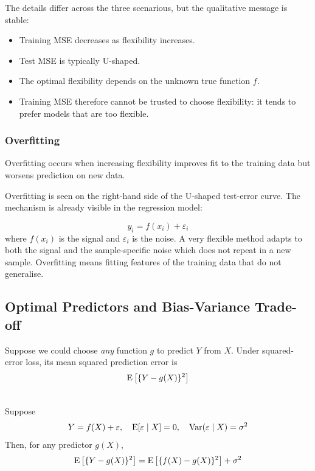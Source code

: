The details differ across the three scenarious, but the qualitative message is stable:
\begin{itemize}
    \item Training MSE decreases as flexibility increases.
    \item Test MSE is typically U-shaped.
    \item The optimal flexibility depends on the unknown true function $f$.
    \item Training MSE therefore cannot be trusted to choose flexibility: it tends to prefer models that are too flexible.
\end{itemize}

\subsubsection{Overfitting}

\begin{definition}[Overfitting]
    Overfitting occurs when increasing flexibility improves fit to the training data but worsens prediction on new data.
\end{definition}
Overfitting is seen on the right-hand side of the U-shaped test-error curve. The mechanism is already visible in the regression model:

\begin{equation*}
    y_i=f(x_i)+\varepsilon_i
\end{equation*}
where $f(x_i)$ is the signal and $\varepsilon_i$ is the noise. A very flexible method adapts to both the signal and the sample-specific noise which does not repeat in a new sample. Overfitting means fitting features of the training data that do not generalise.

\subsection{Optimal Predictors and Bias-Variance Trade-off}
Suppose we could choose \textit{any} function $g$ to predict $Y$ from $X$. Under squared-error loss, its mean squared prediction error is
\begin{equation*}
    \operatorname{E} \big[\{Y-g(X)\}^2\big]
\end{equation*}

\begin{theorem}\label{thm:errordecomp} \leavevmode \\
    Suppose
    \begin{equation*}
        Y=f(X)+\varepsilon, \quad \operatorname{E}[\varepsilon \mid X]=0, \quad \operatorname{Var}(\varepsilon \mid X)=\sigma^2
    \end{equation*}
    Then, for any predictor $g(X)$,
    \begin{equation*}
        \operatorname{E} \big[\{Y-g(X)\}^2\big] = \operatorname{E} \big[\{f(X)-g(X)\}^2\big] + \sigma^2
    \end{equation*}
\end{theorem}

